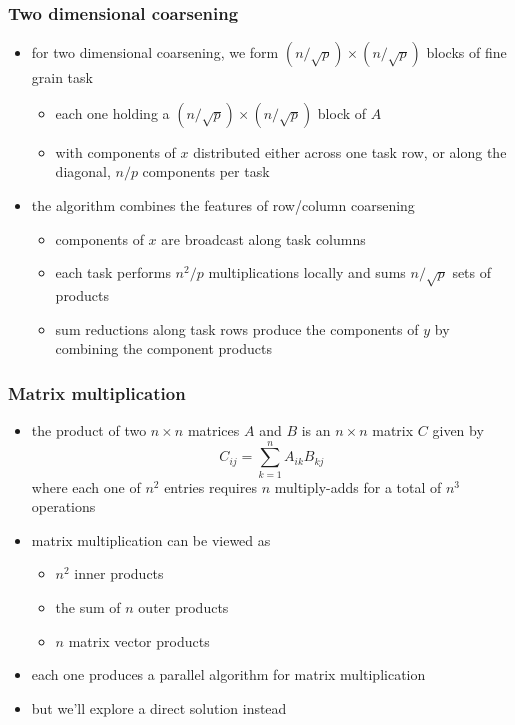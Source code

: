 \begin{frame}[fragile]
%
  \frametitle{Two dimensional coarsening}
%
  \begin{itemize}
%
  \item for two dimensional coarsening, we form $(n/\sqrt{p}) \times (n/\sqrt{p})$ blocks of
    fine grain task
    \begin{itemize}
    \item each one holding a $(n/\sqrt{p}) \times (n/\sqrt{p})$ block of $A$
    \item with components of $x$ distributed either across one task row, or along the diagonal,
      $n/p$ components per task
    \end{itemize}
%
  \item the algorithm combines the features of row/column coarsening
    \begin{itemize}
    \item components of $x$ are broadcast along task columns
    \item each task performs $n^{2}/p$ multiplications locally and sums $n/\sqrt{p}$ sets of
      products
      \item sum reductions along task rows produce the components of $y$ by combining the
        component products
    \end{itemize}
%
  \end{itemize}
%
\end{frame}

\begin{frame}[fragile]
%
  \frametitle{Matrix multiplication}
%
  \begin{itemize}
%
  \item the product of two $n \times n$ matrices $A$ and $B$ is an $n \times n$ matrix $C$
    given by
    \begin{equation*}
      C_{ij} = \sum_{k=1}^{n} A_{ik} B_{kj}
    \end{equation*}
    where each one of $n^{2}$ entries requires $n$ multiply-adds for a total of $n^{3}$
    operations
%
  \item matrix multiplication can be viewed as
    \begin{itemize}
    \item $n^{2}$ inner products
    \item the sum of $n$ outer products
    \item $n$ matrix vector products
    \end{itemize}
%
  \item each one produces a parallel algorithm for matrix multiplication
%
  \item but we'll explore a direct solution instead
%
  \end{itemize}
%
\end{frame}

